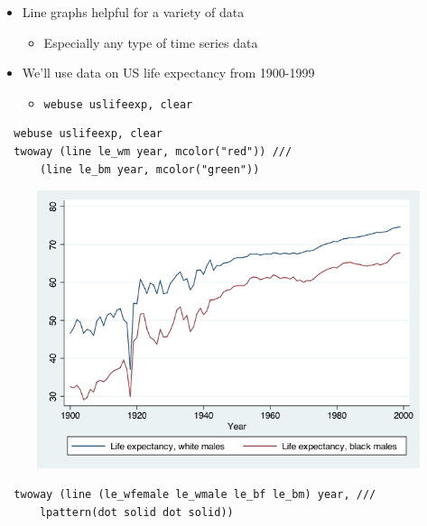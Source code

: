\documentclass[]{book}
\providecommand{\tightlist}{%
  \setlength{\itemsep}{0pt}\setlength{\parskip}{0pt}}
\begin{document}
\begin{itemize}
\tightlist
\item
  Line graphs helpful for a variety of data

  \begin{itemize}
  \tightlist
  \item
    Especially any type of time series data
  \end{itemize}
\item
  We'll use data on US life expectancy from 1900-1999

  \begin{itemize}
  \tightlist
  \item
    \texttt{webuse\ uslifeexp,\ clear}
  \end{itemize}
\end{itemize}

\begin{verbatim}
  webuse uslifeexp, clear
  twoway (line le_wm year, mcolor("red")) ///
      (line le_bm year, mcolor("green"))
\end{verbatim}

\begin{figure}
\centering
\includegraphics{Stata/StataModGraph/images/lineGraph1.png}
\caption{}
\end{figure}

\begin{verbatim}
  twoway (line (le_wfemale le_wmale le_bf le_bm) year, ///
      lpattern(dot solid dot solid))
\end{verbatim}
\end{document}
